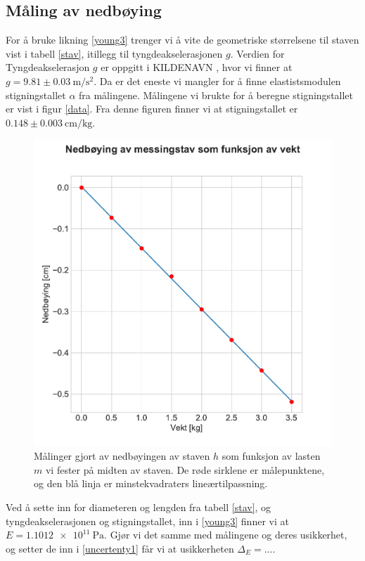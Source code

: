 \documentclass[%
 reprint,
 amsmath,amssymb,
 aps,
]{revtex4-1}
\begin{document}
\subsection{Måling av nedbøying}
For å bruke likning \eqref{young3} trenger vi å vite de geometriske størrelsene til staven vist i tabell \vref{stav}, itillegg til tyngdeakselerasjonen $g$. Verdien for Tyngdeakselerasjon $g$ er oppgitt i KILDENAVN \cite{tyngde}, hvor vi finner at $g=9.81\pm\SI{0.03}{\meter\per\second^2}$. Da er det eneste vi mangler for å finne elastistsmodulen stigningstallet $\alpha$ fra målingene. Målingene vi brukte for å beregne stigningstallet er vist i figur \vref{data}. Fra denne figuren finner vi at stigningstallet er $0.148\pm\SI{0.003}{\centi\meter\per\kilo\gram}$.
\begin{figure}
  \centering
  \includegraphics[scale=0.52]{nedbojing.pdf}
  \caption{Målinger gjort av nedbøyingen av staven $h$ som funksjon av lasten $m$ vi fester på midten av staven. De røde sirklene er målepunktene, og den blå linja er minstekvadraters lineærtilpassning.}
  \label{data}
\end{figure}
Ved å sette inn for diameteren og lengden fra tabell \vref{stav}, og tyngdeakselerasjonen og stigningstallet, inn i \eqref{young3} finner vi at $E=\SI{1.1012e11}{\pascal}$. Gjør vi det samme med målingene og deres usikkerhet, og setter de inn i \eqref{uncertenty1} får vi at usikkerheten $\Delta_E = ...$.
\end{document}
